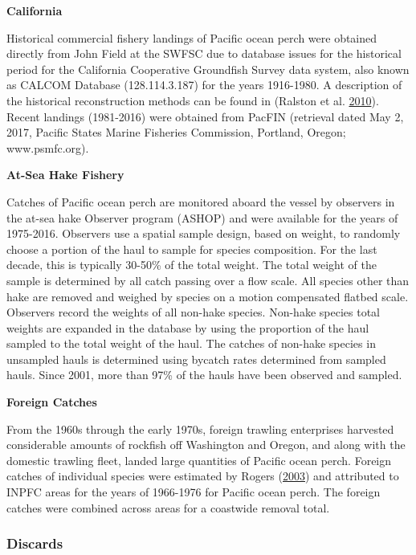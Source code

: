 \documentclass[12pt,]{article}
\begin{document}
\textbf{California}

Historical commercial fishery landings of Pacific ocean perch were
obtained directly from John Field at the SWFSC due to database issues
for the historical period for the California Cooperative Groundfish
Survey data system, also known as CALCOM Database (128.114.3.187) for
the years 1916-1980. A description of the historical reconstruction
methods can be found in (Ralston et al.
\protect\hyperlink{ref-ralston_documentation_2010}{2010}). Recent
landings (1981-2016) were obtained from PacFIN (retrieval dated May 2,
2017, Pacific States Marine Fisheries Commission, Portland, Oregon;
www.psmfc.org).

\textbf{At-Sea Hake Fishery}

Catches of Pacific ocean perch are monitored aboard the vessel by
observers in the at-sea hake Observer program (ASHOP) and were available
for the years of 1975-2016. Observers use a spatial sample design, based
on weight, to randomly choose a portion of the haul to sample for
species composition. For the last decade, this is typically 30-50\% of
the total weight. The total weight of the sample is determined by all
catch passing over a flow scale. All species other than hake are removed
and weighed by species on a motion compensated flatbed scale. Observers
record the weights of all non-hake species. Non-hake species total
weights are expanded in the database by using the proportion of the haul
sampled to the total weight of the haul. The catches of non-hake species
in unsampled hauls is determined using bycatch rates determined from
sampled hauls. Since 2001, more than 97\% of the hauls have been
observed and sampled.

\textbf{Foreign Catches}

From the 1960s through the early 1970s, foreign trawling enterprises
harvested considerable amounts of rockfish off Washington and Oregon,
and along with the domestic trawling fleet, landed large quantities of
Pacific ocean perch. Foreign catches of individual species were
estimated by Rogers (\protect\hyperlink{ref-rogers_species_2003}{2003})
and attributed to INPFC areas for the years of 1966-1976 for Pacific
ocean perch. The foreign catches were combined across areas for a
coastwide removal total.

\subsubsection{Discards}\label{discards}
\end{document}
